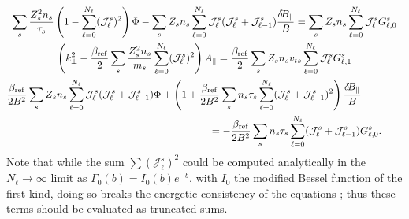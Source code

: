 \documentclass{jpp}
\begin{document}
\begin{gather}
    \sum_s \frac{ Z_s^2n_s}{\tau_s}\left(1-\sum_{\ell=0}^{\color{black} N_\ell}(\mathcal{J}^s_\ell)^2\right)\Phi - \sum_s Z_s n_s \sum_{\ell=0}^{\color{black} N_\ell}\mathcal{J}^s_\ell(\mathcal{J}^s_\ell+\mathcal{J}^s_{\ell-1}){\color{black} \frac{\delta\! B_\parallel}{B}} = \sum_s Z_s n_s \sum_{\ell=0}^{\color{black} N_\ell} \mathcal{J}^s_\ell G^s_{\ell,0} \\
    \left(k_\perp^2 + \frac{\beta_\mathrm{ref}}{2}\sum_s \frac{Z_s^2 n_s}{m_s} \sum_{\ell=0}^{\color{black} N_\ell} (\mathcal{J}^s_\ell)^2\right)A_\parallel = \frac{\beta_\mathrm{ref}}{2}\sum_s Z_s n_s v_{ts} \sum_{\ell=0}^{\color{black} N_\ell} \mathcal{J}^s_\ell G^s_{\ell,1} \\
     \frac{\beta_\mathrm{ref}}{2{\color{black} B^2}}\sum_s Z_s n_s \sum_{\ell=0}^{\color{black} N_\ell}\mathcal{J}^s_\ell(\mathcal{J}^s_\ell+\mathcal{J}^s_{\ell-1})\Phi + \left(1 + \frac{\beta_\mathrm{ref}}{2{\color{black} B^2}}\sum_s n_s \tau_s \sum_{\ell=0}^{\color{black} N_\ell}(\mathcal{J}^s_\ell + \mathcal{J}^s_{\ell-1})^2\right){\color{black} \frac{\delta\! B_\parallel}{B}} \qquad\qquad\notag \\
     \qquad\qquad\qquad\qquad\qquad\qquad \qquad\qquad\qquad= -\frac{\beta_\mathrm{ref}}{2{\color{black} B^2}}\sum_s n_s \tau_s \sum_{\ell=0}^{\color{black} N_\ell}(\mathcal{J}^s_\ell + \mathcal{J}^s_{\ell-1})G^s_{\ell,0}.
\end{gather}
{\color{black} Note that while the sum $\sum (\mathcal{J}_\ell^s)^2$ could be computed analytically in the $N_\ell\rightarrow \infty$ limit as $\Gamma_0(b) = I_0(b) e^{-b}$, with $I_0$ the modified Bessel function of the first kind, doing so breaks the energetic consistency of the equations \citep{Mandell2018}; thus these terms should be evaluated as truncated sums.}
\end{document}
